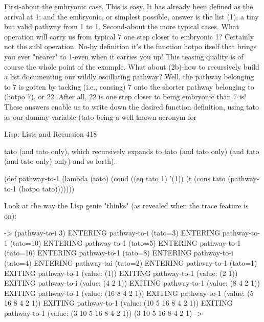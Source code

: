         First-about the embryonic case. This is easy. It has already been defined as the
arrival at 1; and the embryonic, or simplest possible, answer is the list (1), a tiny but
valid pathway from 1 to 1.
        Second-about the more typical cases. What operation will carry us from
typical 7 one step closer to embryonic 1? Certainly not the subl operation. No-by
definition it's the function hotpo itself that brings you ever "nearer" to 1-even when it
carries you up! This teasing quality is of course the whole point of the example. What
about (2b)-how to recursively build a list documenting our wildly oscillating
pathway? Well, the pathway belonging to 7 is gotten by tacking (i.e., consing) 7 onto
the shorter pathway belonging to (hotpo 7), or 22. After all, 22 is one step closer to
being embryonic than 7 is!
        These answers enable us to write down the desired function definition, using
tato as our dummy variable (tato being a well-known acronym for




Lisp: Lists and Recursion                                                              418

tato (and tato only), which recursively expands to tato (and tato only) (and tato
(and tato only) only)-and so forth).

(def pathway-to-1 (lambda (tato)
       (cond ((eq tato 1) '(1))
              (t (cons tato (pathway-to-1 (hotpo tato)))))))

Look at the way the Lisp genie "thinks" (as revealed when the trace feature is on):

-> (pathway-to-i 3)
   ENTERING pathway-to-i (tato=3)
      ENTERING pathway-to-1 (tato=10)
           ENTERING pathway-to-1 (tato=5)
               ENTERING pathway-to-1 (tato=16)
                  ENTERING pathway-to-1 (tato=8)
                    ENTERING pathway-to-i (tato=4)
                       ENTERING pathway-tai (tato=2)
                         ENTERING pathway-to-1 (tato=1)
                         EXITING pathway-to-1 (value: (1))
                       EXITING pathway-to-1 (value: (2 1))
                    EXITING pathway-to-i (value: (4 2 1))
                  EXITING pathway-to-1 (value: (8 4 2 1))
              EXITING pathway-to-1 (value: (16 8 4 2 1))
          EXITING pathway-to-1 (value: (5 16 8 4 2 1))
       EXITING pathway-to-1 (value: (10 5 16 8 4 2 1))
   EXITING pathway-to-1 (value: (3 10 5 16 8 4 2 1))
(3 10 5 16 8 4 2 1)
->

